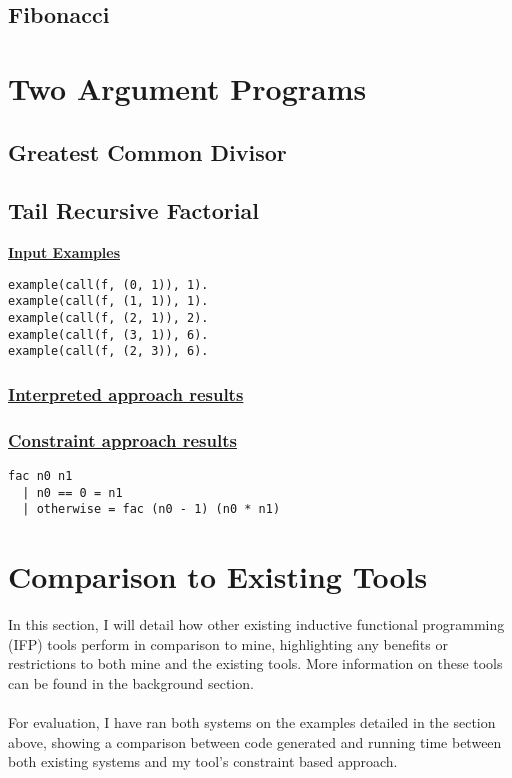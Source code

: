 \subsection{Fibonacci}

\section{Two Argument Programs}

\subsection{Greatest Common Divisor}

\subsection{Tail Recursive Factorial}
\underline{\textbf{Input Examples}}
\begin{lstlisting}
example(call(f, (0, 1)), 1).
example(call(f, (1, 1)), 1).
example(call(f, (2, 1)), 2).
example(call(f, (3, 1)), 6).
example(call(f, (2, 3)), 6).
\end{lstlisting}

\subsubsection{\underline{Interpreted approach results}}

\subsubsection{\underline{Constraint approach results}}
\begin{lstlisting}
fac n0 n1
  | n0 == 0 = n1
  | otherwise = fac (n0 - 1) (n0 * n1)
\end{lstlisting}

\section{Comparison to Existing Tools}

In this section, I will detail how other existing inductive functional programming (IFP) tools perform in comparison to mine, highlighting any benefits or restrictions to both mine and the existing tools. More information on these tools can be found in the background section. \\ \\
For evaluation, I have ran both systems on the examples detailed in the section above, showing a comparison between code generated and running time between both existing systems and my tool's constraint based approach.


